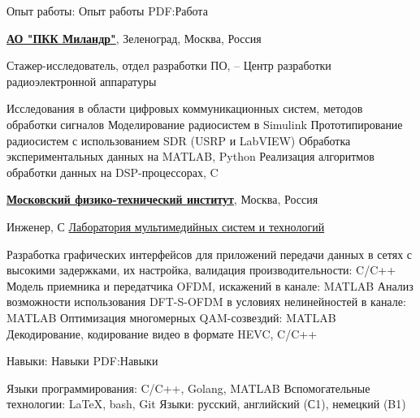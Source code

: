 \documentclass[a4paper, MMyyyy,nonstopmode]{simpleresumecv_ru}
\begin{document}
\begin{Body}



\Section
{Опыт работы:}
{Опыт работы}
{PDF:Работа}

\Entry
\href{https://www.milandr.ru/}
{\textbf{АО "ПКК Миландр"}},
Зеленоград, Москва, Россия

\Gap
\BulletItem
Стажер-исследователь,
отдел разработки ПО,
\hfill
{} -- 
\newline
Центр разработки радиоэлектронной аппаратуры
\begin{Detail}
\SubBulletItem
Исследования в области цифровых коммуникационных систем, методов обработки сигналов
\SubBulletItem
Моделирование радиосистем в Simulink
\SubBulletItem
Прототипирование радиосистем с использованием SDR (USRP и LabVIEW)
\SubBulletItem
Обработка экспериментальных данных на MATLAB, Python
\SubBulletItem
Реализация алгоритмов обработки данных на DSP-процессорах, C
\end{Detail}

\Entry
\href{https://mipt.ru/}
{\textbf{Московский физико-технический институт}},
Москва, Россия

\Gap
\BulletItem
Инженер,
\hfill
С 
\newline
\href{http://labmst.ru/en/}
{Лаборатория мультимедийных систем и технологий}
\begin{Detail}
\SubBulletItem
Разработка графических интерфейсов для приложений передачи данных в сетях с высокими задержками, их настройка, валидация производительности: C/C++
\SubBulletItem
Модель приемника и передатчика OFDM, искажений в канале: MATLAB
\SubBulletItem
Анализ возможности использования DFT-S-OFDM в условиях нелинейностей в канале: MATLAB
\SubBulletItem
Оптимизация многомерных QAM-созвездий: MATLAB
\SubBulletItem
Декодирование, кодирование видео в формате HEVC, C/C++
\end{Detail}



\Section
{Навыки:}
{Навыки}
{PDF:Навыки}

\BulletItem
Языки программирования: C/C++, Golang, MATLAB
\BulletItem
Вспомогательные технологии: {\LaTeX}, bash, Git
\BulletItem
Языки: русский, английский (С1), немецкий (B1)


\end{Body}
\end{document}
